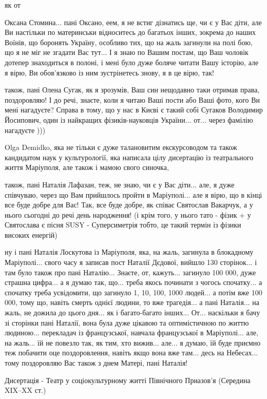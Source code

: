як от

Оксана Стомина... пані Оксано, еем, я не встиг дізнатись ще, чи є у Вас діти,
але Ви настільки по материнськи відноситесь до багатьох інших, зокрема до наших
Воїнів, що боронять Україну, особливо тих, що на жаль загинули на полі бою, що
я не міг не згадати Вас тут... І я знаю по Вашим постам, що Ваш чоловік дотепер
знаходиться в полоні, і мені було дуже боляче читати Вашу історію, але я вірю,
Ви обов'язково із ним зустрінетесь знову, я в це вірю, так!

також, пані Олена Сугак, як я зрозумів, Ваш син нещодавно таки отримав права,
поздоровляю!  І до речі, знаєте, коли я читаю Ваші пости або Ваші фото, кого Ви
мені нагадуєте? Справа в тому, що у нас в Києві є такий собі Сугаков Володимир
Йосипович, один із найкращих фізиків-науковців України...  от... через фамілію нагадуєте
)))  

Olga Demidko, яка не тільки є дуже талановитим екскурсоводом та також
кандидатом наук у культурології, яка написала цілу дисертацію із театрального
життя Маріуполя, але також і мамою свого синочка,

також, пані Наталія Лафазан, теж, не знаю, чи є у Вас діти...
але, я дуже співчуваю, через що Вам прийшлось пройти в Маріуполі...
але я вірю, що в кінці все буде добре для Вас! Так, все буде добре,
як співає Святослав Вакарчук, а у нього сьогодні до речі день народження! 
(і крім того, у нього тато - фізик + у Святослава є пісня SUSY - Суперсиметрія тобто, це такий термін
із фізики високих енергій)

ну і пані Наталія Лоскутова із Маріуполя, яка, на жаль, загинула в блокадному Маріуполі...
свого часу я записав пост Наталії Дєдової, вийшло 130 сторінок... і там було також про пані Наталію...
Знаєте, от, кажуть... загинуло 100 000, дуже страшна цифра... а я думаю так, що...
треба якось починати з чогось спочатку... а спочатку треба усвідомити, що загинуло
1, 10, 100, 1000 людей... а потім вже 100 000, тому що, навіть смерть однієї людини,
то вже трагедія... а пані Наталія... на жаль, не дожила до цього дня... як і багато-багато інших...
От... наскільки я бачу зі сторінки пані Наталії, вона була дуже цікавою та оптимістичною по життю людиною...
перекладач із французської, навчала французської в Маріуполі... але, на жаль... їй не повезло
так, як тим, хто вижив... але... я думаю, їй буде приємно теж побачити оце поздоровлення,
навіть якщо вона вже там... десь на Небесах... тому поздоровляю Вас також з днем Матері, пані Наталія!

Дисертація - Театр у соціокультурному житті Північного Приазов'я (Середина XIX–XX ст.)

